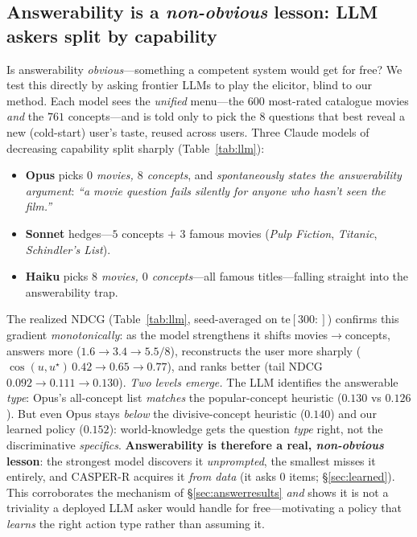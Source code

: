 \documentclass[11pt]{article}
\begin{document}
\subsection{Answerability is a \emph{non-obvious} lesson: LLM askers split by capability}\label{sec:llmask}
Is answerability \emph{obvious}---something a competent system would get for free? We test this directly by asking
frontier LLMs to play the elicitor, blind to our method. Each model sees the \emph{unified} menu---the $600$ most-rated
catalogue movies \emph{and} the $761$ concepts---and is told only to pick the $8$ questions that best reveal a new
(cold-start) user's taste, reused across users. Three Claude models of decreasing capability split sharply
(Table~\ref{tab:llm}):
\begin{itemize}\itemsep1pt
  \item \textbf{Opus} picks \emph{$0$ movies, $8$ concepts}, and \emph{spontaneously states the answerability argument}:
  \emph{``a movie question fails silently for anyone who hasn't seen the film.''}
  \item \textbf{Sonnet} hedges---$5$ concepts $+$ $3$ famous movies (\emph{Pulp Fiction}, \emph{Titanic}, \emph{Schindler's List}).
  \item \textbf{Haiku} picks \emph{$8$ movies, $0$ concepts}---all famous titles---falling straight into the answerability trap.
\end{itemize}
The realized NDCG (Table~\ref{tab:llm}, seed-averaged on te$[300{:}]$) confirms this gradient \emph{monotonically}:
as the model strengthens it shifts movies$\to$concepts, answers more ($1.6\to3.4\to5.5/8$), reconstructs the user more
sharply ($\cos(u,u^\star)\,0.42\to0.65\to0.77$), and ranks better (tail NDCG $0.092\to0.111\to0.130$). \emph{Two levels
emerge.} The LLM identifies the answerable \emph{type}: Opus's all-concept list \emph{matches} the popular-concept
heuristic ($0.130$ vs $0.126$). But even Opus stays \emph{below} the divisive-concept heuristic ($0.140$) and our learned
policy ($0.152$): world-knowledge gets the question \emph{type} right, not the discriminative \emph{specifics}.
\textbf{Answerability is therefore a real, \emph{non-obvious} lesson}: the strongest model
discovers it \emph{unprompted}, the smallest misses it entirely, and \mbox{CASPER-R} acquires it \emph{from data}
(it asks $0$ items; \S\ref{sec:learned}). This corroborates the mechanism of \S\ref{sec:answerresults} \emph{and} shows
it is not a triviality a deployed LLM asker would handle for free---motivating a policy that \emph{learns} the right
action type rather than assuming it.
\end{document}

